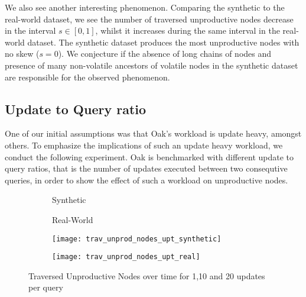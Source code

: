 \documentclass[abstracton,12pt]{scrartcl}
\theoremstyle{definition}
\begin{document}

We also see another interesting phenomenon. Comparing the synthetic to the real-world
dataset, we see the number of traversed unproductive nodes decrease in the interval
$s \in [0,1]$, whilst it increases during the same interval in the real-world dataset.
The synthetic dataset produces the most unproductive nodes with no skew ($s = 0$).
We conjecture if the absence of long chains of nodes and presence of many non-volatile
ancestors of volatile nodes in the synthetic dataset are responsible for the
observed phenomenon.

\subsection{Update to Query ratio}

\label{sec:update-query-ratio}

One of our initial assumptions was that Oak's workload is update heavy, amongst others.
To emphasize the implications of such an update heavy workload, we conduct the following
experiment. Oak is benchmarked with different update to query ratios,
that is the number of updates executed between two consequtive queries,
in order to show the effect of such a workload
on unproductive nodes. 

\begin{figure}[h]
  \centering
  \begin{subfigure}{0.49\linewidth}
    \centering
    Synthetic
  \end{subfigure}
  \begin{subfigure}{0.49\linewidth}
    \centering
    Real-World
  \end{subfigure}
  \begin{subfigure}{0.49\linewidth}
    \centering
    \texttt{[image: trav\_unprod\_nodes\_upt\_synthetic]}
    \caption{}
    \label{fig:trav_unprod_nodes_upt_synthetic}
  \end{subfigure}
  \begin{subfigure}{0.49\linewidth}
    \centering
    \texttt{[image: trav\_unprod\_nodes\_upt\_real]}
    \caption{}
    \label{fig:trav_unprod_nodes_upt_real}
  \end{subfigure}
  \caption{Traversed Unproductive Nodes over time for 1,10 and 20 updates per query}
\end{figure}
\end{document}
